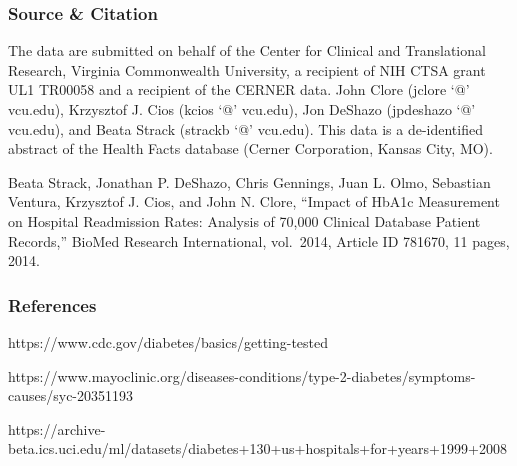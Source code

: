 \documentclass[5p]{elsarticle} %
\begin{document}
\hypertarget{source-citation}{%
\subsubsection{Source \& Citation}\label{source-citation}}

The data are submitted on behalf of the Center for Clinical and
Translational Research, Virginia Commonwealth University, a recipient of
NIH CTSA grant UL1 TR00058 and a recipient of the CERNER data. John
Clore (jclore `@' vcu.edu), Krzysztof J. Cios (kcios `@' vcu.edu), Jon
DeShazo (jpdeshazo `@' vcu.edu), and Beata Strack (strackb `@' vcu.edu).
This data is a de-identified abstract of the Health Facts database
(Cerner Corporation, Kansas City, MO).

Beata Strack, Jonathan P. DeShazo, Chris Gennings, Juan L. Olmo,
Sebastian Ventura, Krzysztof J. Cios, and John N. Clore, ``Impact of
HbA1c Measurement on Hospital Readmission Rates: Analysis of 70,000
Clinical Database Patient Records,'' BioMed Research International,
vol.~2014, Article ID 781670, 11 pages, 2014.

\hypertarget{references}{%
\subsubsection{References}\label{references}}

https://www.cdc.gov/diabetes/basics/getting-tested

https://www.mayoclinic.org/diseases-conditions/type-2-diabetes/symptoms-causes/syc-20351193

https://archive-beta.ics.uci.edu/ml/datasets/diabetes+130+us+hospitals+for+years+1999+2008
\end{document}
